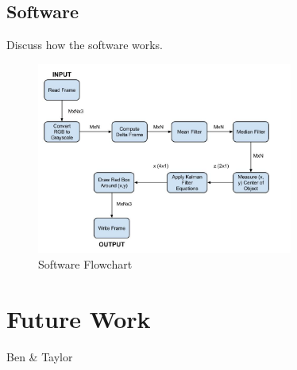 \documentclass[12pt]{article} %
\begin{document}
\subsection{Software}
Discuss how the software works.
\begin{figure}[h]
\centering
\includegraphics[width=0.75\textwidth]{./images/software_flow.jpg}
\caption{Software Flowchart}
\label{fig:sw_flow}    
\end{figure}
\section{Future Work}
Ben \& Taylor
\end{document}
